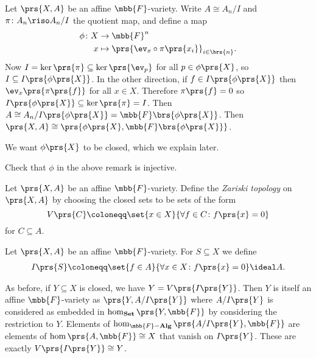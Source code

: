 \documentclass[10pt,a4paper,twoside,openany,hidelinks]{book}
\begin{document}
\begin{remark}
Let $\prs{X,A}$ be an affine $\mbb{F}$-variety. Write $A \cong A_n / I$ and $\pi \colon A_n \riso A_n/I$ the quotient map, and define a map
\begin{align*}
\phi \colon X &\to \mbb{F}^n \\
x &\mapsto \prs{\ev_x \circ \pi\prs{x_i}}_{i \in \brs{n}} \text{.}
\end{align*}
Now $I = \ker\prs{\pi} \subseteq \ker\prs{\ev_p}$ for all $p \in \phi\prs{X}$, so $I \subseteq I\prs{\phi\prs{X}}$.
In the other direction, if $f \in I\prs{\phi\prs{X}}$ then $\ev_x\prs{\pi\prs{f}}$ for all $x \in X$. Therefore $\pi\prs{f} = 0$ so $I\prs{\phi\prs{X}} \subseteq \ker\prs{\pi} = I$.
Then $A \cong A_n / I\prs{\phi\prs{X}} = \mbb{F}\brs{\phi\prs{X}}$.
Then
$\prs{X,A} \cong \prs{\phi\prs{X}, \mbb{F}\brs{\phi\prs{X}}}$.

We want $\phi\prs{X}$ to be closed, which we explain later.
\end{remark}

\begin{exercise}
Check that $\phi$ in the above remark is injective.
\end{exercise}

\begin{definition}
Let $\prs{X,A}$ be an affine $\mbb{F}$-variety. Define the \emph{Zariski topology} on $\prs{X,A}$ by choosing the closed sets to be sets of the form
\[V\prs{C} \coloneqq \set{x \in X}{\forall f \in C \colon f\prs{x} = 0}\]
for $C \subseteq A$.
\end{definition}

\begin{definition}
Let $\prs{X,A}$ be an affine $\mbb{F}$-variety. For $S \subseteq X$ we define
\begin{align*}
I\prs{S} \coloneqq \set{f \in A}{\forall x \in X \colon f\prs{x} = 0} \ideal A \text{.}
\end{align*}
\end{definition}

\begin{remark}
As before, if $Y \subseteq X$ is closed, we have $Y = V\prs{I\prs{Y}}$. Then $Y$ is itself an affine $\mbb{F}$-variety as $\prs{Y, A/I\prs{Y}}$ where $A/I\prs{Y}$ is considered as embedded in $\hom_{\mathbf{Set}}\prs{Y,\mbb{F}}$ by considering the restriction to $Y$.
Elements of
$\hom_{\mbb{F}\mathbf{-Alg}}\prs{A/I\prs{Y}, \mbb{F}}$
are elements of $\hom\prs{A,\mbb{F}} \cong X$ that vanish on $I\prs{Y}$. These are exactly $V\prs{I\prs{Y}} \cong Y$.
\end{remark}
\end{document}
